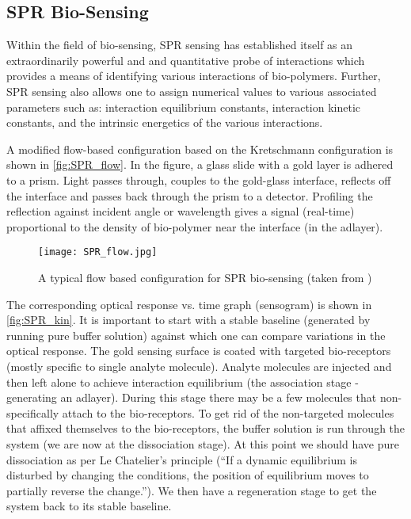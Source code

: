 \subsection{SPR Bio-Sensing}

Within the field of bio-sensing, SPR sensing has established itself as an extraordinarily powerful and and quantitative probe of interactions which provides a means of identifying various interactions of bio-polymers. Further, SPR sensing also allows one to assign numerical values to various associated parameters such as: interaction equilibrium constants, interaction kinetic constants, and the intrinsic energetics of the various interactions.

A modified flow-based configuration based on the Kretschmann configuration is shown in \autoref{fig:SPR_flow}. In the figure, a glass slide with a gold layer is adhered to a prism. Light passes through, couples to the gold-glass interface, reflects off the interface and passes back through the prism to a detector. Profiling the reflection against incident angle or wavelength gives a signal (real-time) proportional to the density of bio-polymer near the interface (in the adlayer). 

\begin{figure}
\centering
	\texttt{[image: SPR\_flow.jpg]}
\caption{A typical flow based configuration for SPR bio-sensing (taken from \cite{flow_pdf})}
\label{fig:SPR_flow}
\end{figure}

The corresponding optical response vs. time graph (sensogram) is shown in \autoref{fig:SPR_kin}. It is important to start with a stable baseline (generated by running pure buffer solution) against which one can compare variations in the optical response. The gold sensing surface is coated with targeted bio-receptors (mostly specific to single analyte molecule). Analyte molecules are injected and then left alone to achieve interaction equilibrium (the association stage - generating an adlayer). During this stage there may be a few molecules that non-specifically attach to the bio-receptors. To get rid of the non-targeted molecules that affixed themselves to the bio-receptors, the buffer solution is run through the system (we are now at the dissociation stage). At this point we should have pure dissociation as per Le Chatelier's principle (``If a dynamic equilibrium is disturbed by changing the conditions, the position of equilibrium moves to partially reverse the change.''). We then have a regeneration stage to get the system back to its stable baseline.

